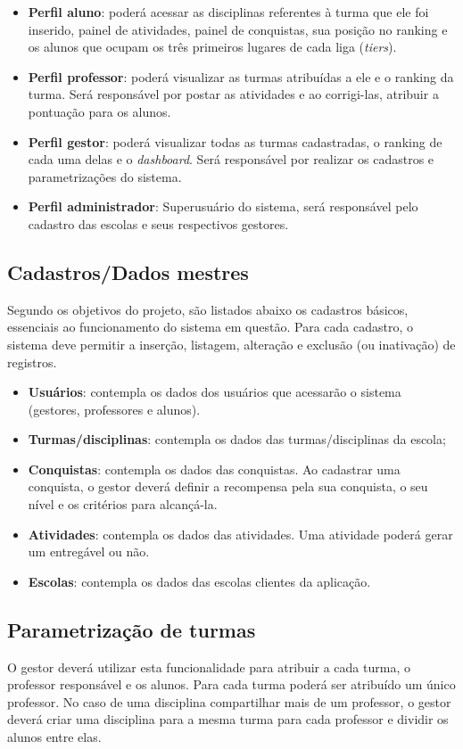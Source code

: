 \documentclass[
    12pt,               %
    openright,          %
    oneside,
    a4paper,            %
    paginasA3,  %
    english,            %
    brazil              %
    ]{ifsp-spo-inf-ctds} %
\begin{document}
\begin{itemize}
\item \textbf{Perfil aluno}: poderá acessar as disciplinas referentes à turma que ele foi inserido, painel de atividades, painel de conquistas, sua posição no ranking e os alunos que ocupam os três primeiros lugares de cada liga (\textit{\glspl{tier}}).
\item \textbf{Perfil professor}: poderá visualizar as turmas atribuídas a ele e o ranking da turma. Será responsável por postar as atividades e ao corrigi-las, atribuir a pontuação para os alunos.
\item \textbf{Perfil gestor}: poderá visualizar todas as turmas cadastradas, o ranking de cada uma delas e o \textit{\gls{dashboard}}. Será responsável por realizar os cadastros e parametrizações do sistema.
\item \textbf{Perfil administrador}: Superusuário do sistema, será responsável pelo cadastro das escolas e seus respectivos gestores.
\end{itemize}


\subsection{Cadastros/Dados mestres}
Segundo os objetivos do projeto, são listados abaixo os cadastros básicos, essenciais ao funcionamento do sistema em questão. Para cada cadastro, o sistema deve permitir a inserção, listagem, alteração e exclusão (ou inativação) de registros. 
\begin{itemize}
\item \textbf{Usuários}: contempla os dados dos usuários que acessarão o sistema (gestores, professores e alunos).
\item \textbf{Turmas/disciplinas}: contempla os dados das turmas/disciplinas da escola;
\item \textbf{Conquistas}: contempla os dados das conquistas. Ao cadastrar uma conquista, o gestor deverá definir a recompensa pela sua conquista, o seu nível e os critérios para alcançá-la.
\item \textbf{Atividades}: contempla os dados das atividades. Uma atividade poderá gerar um entregável ou não.
\item \textbf{Escolas}: contempla os dados das escolas clientes da aplicação.
\end{itemize}


\subsection{Parametrização de turmas}
O gestor deverá utilizar esta funcionalidade para atribuir a cada turma, o professor responsável e os alunos. Para cada turma poderá ser atribuído um único professor. No caso de uma disciplina compartilhar mais de um professor, o gestor deverá criar uma disciplina para a mesma turma para cada professor e dividir os alunos entre elas. 
\end{document}
